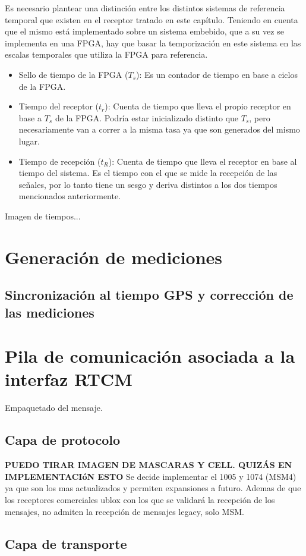 \documentclass[a4paper,12pt,oneside,onecolumn,final,openright]{book}%
\begin{document}
	Es necesario plantear una distinción entre los distintos sistemas de referencia temporal que existen en el receptor tratado en este capítulo. Teniendo en cuenta que el mismo está implementado sobre un sistema embebido, que a su vez se implementa en una FPGA, hay que basar la temporización en este sistema en las escalas temporales que utiliza la FPGA para referencia. 
\begin{itemize}
	\item Sello de tiempo de la FPGA ($T_s$): Es un contador de tiempo en base a ciclos de la FPGA. 
	\item Tiempo del receptor ($t_r$): Cuenta de tiempo que lleva el propio receptor en base a $T_s$ de la FPGA. Podría estar inicializado distinto que $T_s$, pero necesariamente van a correr a la misma tasa ya que son generados del mismo lugar.
	\item Tiempo de recepción ($t_R$): Cuenta de tiempo que lleva el receptor en base al tiempo del sistema. Es el tiempo con el que se mide la recepción de las señales, por lo tanto tiene un sesgo y deriva distintos a los dos tiempos mencionados anteriormente.
\end{itemize}
	Imagen de tiempos...
\section{Generación de mediciones}
\subsection{Sincronización al tiempo GPS y corrección de las mediciones}

\section{Pila de comunicación asociada a la interfaz RTCM}
Empaquetado del mensaje. \cite{detector}
\subsection{Capa de protocolo}
\textbf{PUEDO TIRAR IMAGEN DE MASCARAS Y CELL. QUIZÁS EN IMPLEMENTACIóN ESTO}
Se decide implementar el 1005 y 1074 (MSM4) ya que son los mas actualizados y permiten expansiones a futuro. Ademas de que los receptores comerciales ublox con los que se validará la recepción de los mensajes, no admiten la recepción de mensajes legacy, solo MSM.
\subsection{Capa de transporte}
\end{document}
